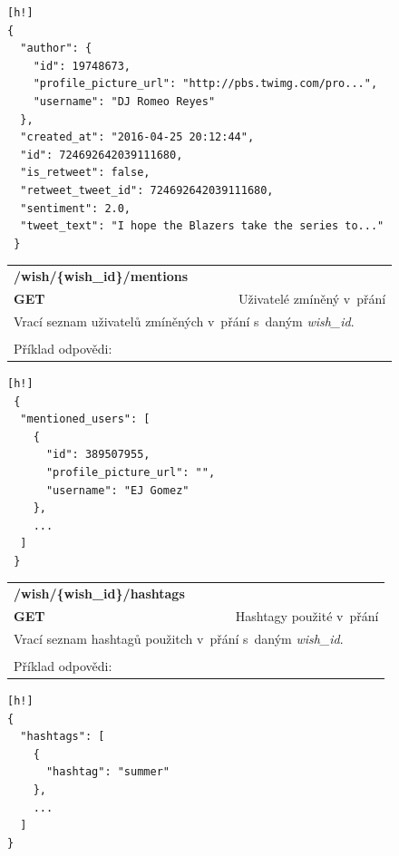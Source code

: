 \documentclass[thesis=B,czech]{FITthesis}[2012/06/26]
\begin{document}
\begin{lstlisting}[nolol=true][h!]
{
  "author": {
    "id": 19748673,
    "profile_picture_url": "http://pbs.twimg.com/pro...",
    "username": "DJ Romeo Reyes"
  },
  "created_at": "2016-04-25 20:12:44",
  "id": 724692642039111680,
  "is_retweet": false,
  "retweet_tweet_id": 724692642039111680,
  "sentiment": 2.0,
  "tweet_text": "I hope the Blazers take the series to..."
 }
\end{lstlisting} 

\begin{table}[h]
\begin{tabular}{llllr}
\rowcolor[HTML]{EFEFEF}
\large \textbf{/wish/\{wish\_id\}/mentions}        &         &                 &        & \multicolumn{1}{l}{}                \\
\rowcolor[HTML]{EFEFEF}
\textbf{GET}          &         &                 &        & Uživatelé zmíněný v~přání                        \\
\multicolumn{5}{l}{\parbox[t]{12.8cm}{Vrací seznam uživatelů zmíněných v~přání s~daným \textit{wish\_id}.}  } \\    
 & & & & \\
 Příklad odpovědi:
\end{tabular}
\end{table}

\begin{lstlisting}[nolol=true][h!]
 {
  "mentioned_users": [
    {
      "id": 389507955,
      "profile_picture_url": "",
      "username": "EJ Gomez"
    },
    ...
  ]
 }
\end{lstlisting} 

\begin{table}[h]
\begin{tabular}{llllr}
\rowcolor[HTML]{EFEFEF}
\large \textbf{/wish/\{wish\_id\}/hashtags}        &         &                 &        & \multicolumn{1}{l}{}                \\
\rowcolor[HTML]{EFEFEF}
\textbf{GET}          &         &                 &        & Hashtagy použité v~přání                        \\
\multicolumn{5}{l}{\parbox[t]{12.8cm}{Vrací seznam hashtagů použitch v~přání s~daným \textit{wish\_id}.}  } \\   
 & & & & \\
 Příklad odpovědi: 
\end{tabular}
\end{table}

\noindent\begin{minipage}{\textwidth}
\begin{lstlisting}[nolol=true][h!]
{
  "hashtags": [
    {
      "hashtag": "summer"
    },
    ...
  ]
}
\end{lstlisting} 
\end{minipage}
\end{document}
